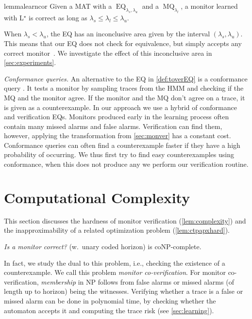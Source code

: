 \documentclass[runningheads]{llncs}
\newcommand{\EQ}{\operatorname{EQ}}
\newcommand{\MQ}{\operatorname{MQ}}
\renewcommand{\paragraph}[1]{\smallskip\noindent\emph{#1}}
\begin{document}
\begin{restatable}{lemma}{learncor}
    Given a MAT with a $\EQ_{\lambda_s, \lambda_u}$ and a $\MQ_{\lambda_l}$, a monitor learned with L$^\star$ is correct as long as $\lambda_s \leq \lambda_l \leq \lambda_u$.
\end{restatable}
\noindent When $\lambda_s < \lambda_u$, the EQ has an inconclusive area given by the interval $(\lambda_s, \lambda_u)$.
This means that our EQ does not check for equivalence, but simply accepts any correct monitor~\cite{DBLP:journals/jalc/PeledVY02}. We investigate the effect of this inconclusive area in \cref{sec:experiments}.

\paragraph{Conformance queries.}
An alternative to the EQ in \cref{def:toverEQ} is a conformance query \cite{groceAdaptiveModelChecking2002}. It tests a monitor by sampling traces from the HMM and checking if the MQ and the monitor agree. If the monitor and the MQ don't agree on a trace, it is given as a counterexample. In our approach we use a hybrid of conformance and verification EQs. Monitors produced early in the learning process often contain many missed alarms and false alarms. Verification can find them, however, applying the transformation from \cref{sec:monver} has a constant cost. Conformance queries can often find a counterexample faster if they have a high probability of occurring. We thus first try to find easy counterexamples using conformance, when this does not produce any we perform our verification routine.

\section{Computational Complexity}\label{sec:compl}
This section discusses the hardness of monitor verification (\cref{lem:complexity}) and the inapproximability of a related optimization problem (\cref{lem:ctpapxhard}).
\begin{theorem}
    \label{lem:complexity}
    \emph{Is a monitor correct?} (w.\ unary coded horizon) is coNP-complete.
\end{theorem}
In fact, we study the dual to this problem, i.e., checking the existence of a counterexample. We call this problem \emph{monitor co-verification}. For monitor co-verification, \emph{membership} in NP follows from false alarms or missed alarms (of length up to horizon) being the witnesses.
Verifying whether a trace is a false or missed alarm can be done in polynomial time, by checking whether the automaton accepts it and computing the trace risk (see \cref{sec:learning}).
\end{document}
